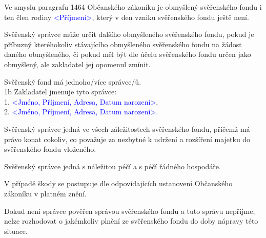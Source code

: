\documentclass[parskip=half]{scrreprt}
\begin{document}
\begin{contract}
Ve smyslu paragrafu 1464 Občanského zákoníku je obmyšlený svěřenského fondu i ten člen rodiny \textcolor{blue}{<Příjmení>}, který v den vzniku svěřenského fondu ještě není.


Svěřenský správce může určit dalšího obmyšleného svěřenského fondu, pokud je příbuzný kteréhokoliv stávajícího obmyšleného svěřenského fondu na žádost daného obmyšleného, či pokud měl být dle účelu svěřenského fondu určen jako obmyšlený, ale zakladatel jej opomenul zmínit.



Svěřenský fond má jednoho/více správce/ů.\\
1b Zakladatel jmenuje tyto správce:\\
1. \textcolor{blue}{<Jméno, Příjmení, Adresa, Datum narození>},\\
2. \textcolor{blue}{<Jméno, Příjmení, Adresa, Datum narození>}.

Svěřenský správce jedná ve všech záležitostech svěřenského fondu, přičemž má právo konat cokoliv, co považuje za nezbytné k udržení a rozšíření majetku do svěřenského fondu vloženého.

Svěřenský správce jedná s náležitou péčí a s péčí řádného hospodáře.

V případě škody se postupuje dle odpovídajících ustanovení Občanského zákoníku v platném znění.

Dokud není správce pověřen správou svěřenského fondu a tuto správu nepřijme, nelze rozhodovat o jakémkoliv plnění ze svěřenského fondu do doby nápravy této situace.


\end{contract}
\end{document}
